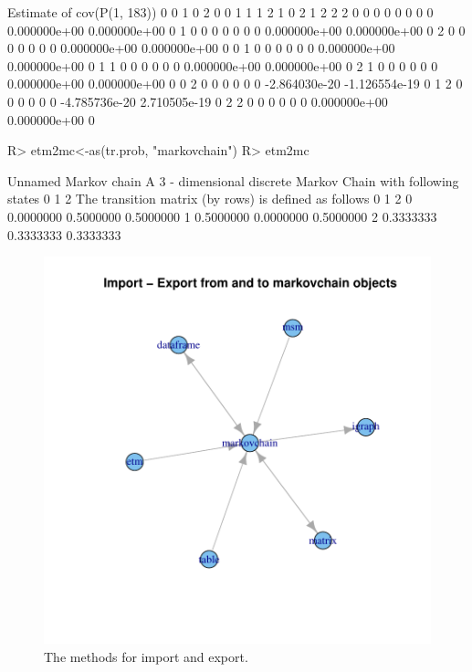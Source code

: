 \documentclass[nojss]{jss}
\begin{document}
\begin{Schunk}
\begin{Soutput}
Estimate of cov(P(1, 183))
    0 0 1 0 2 0 0 1 1 1 2 1           0 2           1 2 2 2
0 0   0   0   0   0   0   0  0.000000e+00  0.000000e+00   0
1 0   0   0   0   0   0   0  0.000000e+00  0.000000e+00   0
2 0   0   0   0   0   0   0  0.000000e+00  0.000000e+00   0
0 1   0   0   0   0   0   0  0.000000e+00  0.000000e+00   0
1 1   0   0   0   0   0   0  0.000000e+00  0.000000e+00   0
2 1   0   0   0   0   0   0  0.000000e+00  0.000000e+00   0
0 2   0   0   0   0   0   0 -2.864030e-20 -1.126554e-19   0
1 2   0   0   0   0   0   0 -4.785736e-20  2.710505e-19   0
2 2   0   0   0   0   0   0  0.000000e+00  0.000000e+00   0
\end{Soutput}
\begin{Sinput}
R> etm2mc<-as(tr.prob, "markovchain")
R> etm2mc
\end{Sinput}
\begin{Soutput}
Unnamed Markov chain 
 A  3 - dimensional discrete Markov Chain with following states 
 0 1 2 
 The transition matrix   (by rows)  is defined as follows 
          0         1         2
0 0.0000000 0.5000000 0.5000000
1 0.5000000 0.0000000 0.5000000
2 0.3333333 0.3333333 0.3333333
\end{Soutput}
\end{Schunk}

\begin{figure}
\begin{center}
\includegraphics{an_introduction_to_markovchain_package-importExportPlot}
\caption{The  methods for import and export.}
\label{fig:fromAndTo}
\end{center}
\end{figure}
\end{document}
